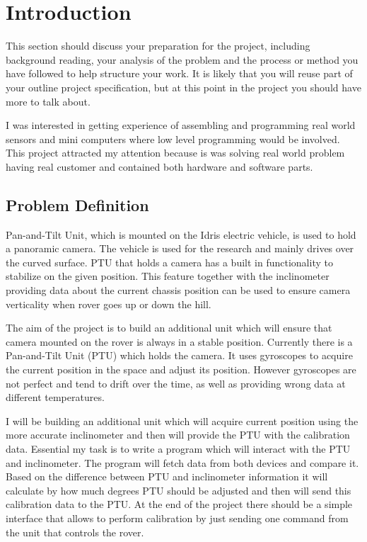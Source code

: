 \chapter{Introduction}
This section should discuss your preparation for the project, including background reading, your analysis of the problem and the process or method you have followed to help structure your work.  It is likely that you will reuse part of your outline project specification, but at this point in the project you should have more to talk about. 

I was interested in getting experience of assembling and programming real world sensors and mini computers where low level programming would be involved. This project attracted my attention because is was solving real world problem having real customer and contained both hardware and software parts.

\section{Problem Definition}
Pan-and-Tilt Unit, which is mounted on the Idris electric vehicle, is used to hold a panoramic camera. The vehicle is used for the research and mainly drives over the curved surface.  PTU that holds a camera has a built in functionality to stabilize on the given position. This feature together with the inclinometer providing data about the current chassis position can be used to ensure camera verticality when rover goes up or down the hill. 


The aim of the project is to build an additional unit which will ensure that camera mounted on the rover is always in a stable position. Currently there is a Pan-and-Tilt Unit (PTU) which holds the camera. It uses gyroscopes to acquire the current position in the space and adjust its position. However gyroscopes are not perfect and tend to drift over the time, as well as providing wrong data at different temperatures.

I will be building an additional unit which will acquire current position using the more accurate inclinometer and then will provide the PTU with the calibration data. Essential my task is to write a program which will interact with the PTU and inclinometer. The program will fetch data from both devices and compare it. Based on the difference between PTU and inclinometer information it will calculate by how much degrees PTU should be adjusted and then will send this calibration data to the PTU. At the end of the project there should be a simple interface that allows to perform calibration by just sending one command from the unit that controls the rover.


